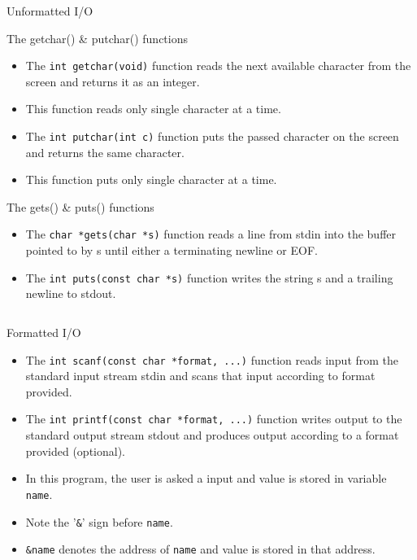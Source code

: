 \documentclass[10pt,t]{beamer}
\begin{document}
\begin{frame}[fragile]{Unformatted I/O}
  \begin{block}{The getchar() \& putchar() functions}
    \begin{itemize}
      \item The \lstinline|int getchar(void)| function reads the next available character from the screen and returns it as an integer. 
      \item[] This function reads only single character at a time.
      \item The \lstinline|int putchar(int c)| function puts the passed character on the screen and returns the same character. 
      \item[] This function puts only single character at a time. 
    \end{itemize}
  \end{block}

  \begin{block}{The gets() \& puts() functions}
    \begin{itemize}
      \item The \lstinline|char *gets(char *s)| function reads a line from stdin into the buffer pointed to by s until either a terminating newline or EOF.
      \item The \lstinline|int puts(const char *s)| function writes the string s and a trailing newline to stdout.
    \end{itemize}
  \end{block}
\end{frame}

\begin{frame}[fragile]
  \begin{columns}
    
    
  \end{columns}
\end{frame}

\begin{frame}[fragile]{Formatted I/O}
  \begin{itemize}
    \item The \lstinline|int scanf(const char *format, ...)| function reads input from the standard input stream stdin and scans that input according to format provided.
    \item The \lstinline|int printf(const char *format, ...)| function writes output to the standard output stream stdout and produces output according to a format provided (optional).
      
    \item In this program, the user is asked a input and value is stored in variable \lstinline|name|.
    \item Note the '\lstinline|&|' sign before \lstinline|name|.
    \item \lstinline|&name| denotes the address of \lstinline|name| and value is stored in that address.
  \end{itemize}
\end{frame}
\end{document}
